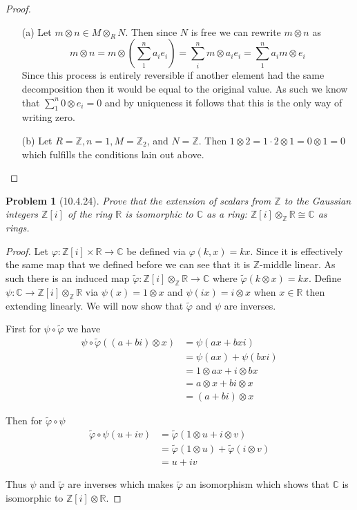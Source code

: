 \documentclass[10pt]{article}
\newcommand{\sk}{\vskip 10mm}
\newcommand{\bb}[1]{\mathbb{#1}}
\newcommand{\wt}[1]{\widetilde{#1}}
\theoremstyle{plain}
\newtheorem{problem}{Problem}
\theoremstyle{remark}
\begin{document}
\begin{proof}
  \begin{enumerate}
  \item[(a)] Let $m\otimes n\in M\otimes_R N$. Then since $N$ is free we can rewrite $m\otimes n$ as
    \[
      m\otimes n = m \otimes \left(\sum_1^n a_i e_i\right) = \sum_i^n m\otimes a_i e_i= \sum_1^n a_i m \otimes e_i
    \]
    Since this process is entirely reversible if another element had the same
    decomposition then it would be equal to the original value. As such we know
    that $\sum_1^n 0\otimes e_i=0 $ and by uniqueness it follows that this is the only way of
    writing zero.
  \item[(b)] Let $R=\bb{Z},n=1,M=\bb{Z}_2$, and $N=\bb{Z}$. Then $1\otimes 2=1\cdot 2\otimes 1=0\otimes 1=0$
    which fulfills the conditions lain out above.
  \end{enumerate}
\end{proof}

\sk

\begin{problem}[10.4.24]
  Prove that the extension of scalars from $\bb{Z}$ to the Gaussian integers
  $\bb{Z}[i]$ of the ring $\bb{R}$ is isomorphic to $\bb{C}$ as a ring:
  $\bb{Z}[i]\otimes_{\bb{Z}}\bb{R}\cong\bb{C}$ as rings.
\end{problem}

\begin{proof}
  Let $\varphi:\bb{Z}[i]\times\bb{R}\rightarrow \bb{C}$ be defined via $\varphi(k,x)=kx$. Since it
  is effectively the same map that we defined before we can see that it
  is $\bb{Z}$-middle linear. As such there is an induced map
  $\wt{\varphi}:\bb{Z}[i]\otimes_{\bb{Z}}\bb{R}\rightarrow\bb{C}$ where $\wt{\varphi}(k\otimes x)=kx$.
  Define $\psi:\bb{C}\rightarrow \bb{Z}[i]\otimes_{\bb{Z}}\bb{R}$ via $\psi(x)=1\otimes x$ and $\psi(ix)=i\otimes x$
  when $x\in \bb{R}$ then extending linearly. We will now show that $\wt{\varphi}$ and
  $\psi$ are inverses.

  First for $\psi\circ\wt{\varphi}$ we have
  \begin{align*}
    \psi\circ\wt{\varphi}((a+bi)\otimes x) &= \psi(ax+bxi)\\
                        &= \psi(ax)+\psi(bxi)\\
                        &= 1\otimes ax + i\otimes bx\\
                        &= a\otimes x + bi\otimes x\\
                        &= (a+bi)\otimes x
  \end{align*}

  Then for $\wt{\varphi}\circ\psi$
  \begin{align*}
    \wt{\varphi}\circ\psi(u+iv) &= \wt{\varphi}(1\otimes u+i\otimes v)\\
                   &= \wt{\varphi}(1\otimes u)+\wt{\varphi}(i\otimes v)\\
                   &= u+iv
  \end{align*}

  Thus $\psi$ and $\wt{\varphi}$ are inverses which makes $\wt{\varphi}$ an isomorphism
  which shows that $\bb{C}$ is isomorphic to $\bb{Z}[i]\otimes \bb{R}$.
\end{proof}
\end{document}
